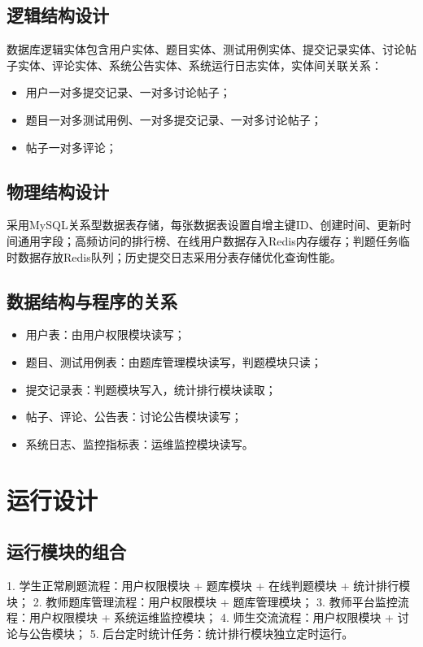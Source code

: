 \documentclass{../template/softeng}
\begin{document}
\subsection{逻辑结构设计}
数据库逻辑实体包含用户实体、题目实体、测试用例实体、提交记录实体、讨论帖子实体、评论实体、系统公告实体、系统运行日志实体，实体间关联关系：
\begin{itemize}
    \item 用户一对多提交记录、一对多讨论帖子；
    \item 题目一对多测试用例、一对多提交记录、一对多讨论帖子；
    \item 帖子一对多评论；
\end{itemize}

\subsection{物理结构设计}
采用MySQL关系型数据表存储，每张数据表设置自增主键ID、创建时间、更新时间通用字段；高频访问的排行榜、在线用户数据存入Redis内存缓存；判题任务临时数据存放Redis队列；历史提交日志采用分表存储优化查询性能。

\subsection{数据结构与程序的关系}
\begin{itemize}
    \item 用户表：由用户权限模块读写；
    \item 题目、测试用例表：由题库管理模块读写，判题模块只读；
    \item 提交记录表：判题模块写入，统计排行模块读取；
    \item 帖子、评论、公告表：讨论公告模块读写；
    \item 系统日志、监控指标表：运维监控模块读写。
\end{itemize}

\section{运行设计}
\subsection{运行模块的组合}
1. 学生正常刷题流程：用户权限模块 + 题库模块 + 在线判题模块 + 统计排行模块；
2. 教师题库管理流程：用户权限模块 + 题库管理模块；
3. 教师平台监控流程：用户权限模块 + 系统运维监控模块；
4. 师生交流流程：用户权限模块 + 讨论与公告模块；
5. 后台定时统计任务：统计排行模块独立定时运行。
\end{document}
